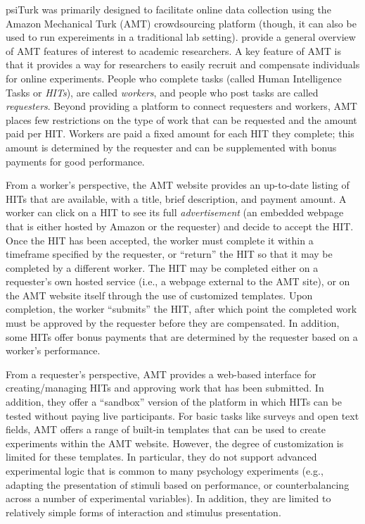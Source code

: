 \documentclass[twocolumn]{svjour3}          %
\newcommand{\psiturk}[0]{\textsf{psiTurk}}
\begin{document}
\psiturk{} was primarily designed to facilitate online data collection using
the Amazon Mechanical Turk (AMT) crowdsourcing platform (though, it can also be
used to run expereiments in a traditional lab setting).
\cite{Mason:2012xy} provide a general overview of AMT features of
interest to academic researchers.  A key feature of AMT is that it provides a way for researchers
to easily recruit and compensate individuals for online experiments.  
People who complete tasks (called Human Intelligence Tasks or \emph{HITs}), are 
called \emph{workers}, and people who post tasks are called \emph{requesters}.
Beyond providing a platform to connect requesters and workers, AMT places few restrictions 
on the type of work that can be requested and the amount paid per HIT.  Workers are 
paid a fixed amount for each HIT they complete; this amount is determined by the requester and
can be supplemented with bonus payments for good performance.

From a worker's perspective, the AMT website provides an up-to-date listing of HITs that 
are available, with a title, brief description, and payment amount.  A worker can click on a HIT to 
see its full \emph{advertisement} (an embedded webpage that is either hosted by
Amazon or the requester) and decide to accept the HIT. Once the HIT has been accepted,
the worker must complete it within a timeframe specified by the requester, or ``return'' the HIT
so that it may be completed by a different worker. The HIT may be completed either 
on a requester's own hosted service (i.e., a webpage 
external to the AMT site), or on the AMT website itself through the use of customized templates.
Upon completion, the worker ``submits'' the HIT, after which point the completed work must 
be approved by the requester before they are compensated.
In addition, some HITs offer bonus payments that are determined by the requester based 
on a worker's performance.

From a requester's perspective, AMT provides a web-based interface for creating/managing 
HITs and approving work that has been submitted.  In addition, they offer a ``sandbox'' version 
of the platform in which HITs can be tested without paying live participants.
For basic tasks like surveys and open text fields, AMT offers a range of built-in templates that 
can be used to create experiments within the AMT website.  However, the degree of customization 
is limited for these templates. In particular, they do not support advanced experimental logic that is 
common to many psychology experiments (e.g., adapting the presentation of stimuli based on 
performance, or counterbalancing across a number of experimental variables).
In addition, they are limited to relatively simple forms of interaction and stimulus presentation.
\end{document}
